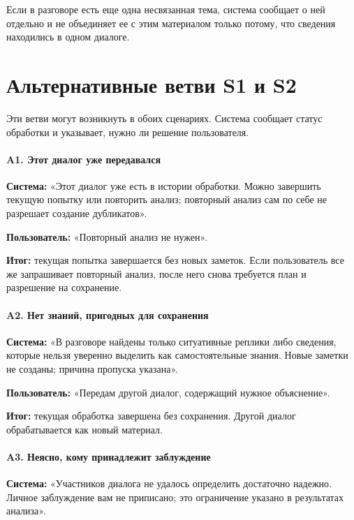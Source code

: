 Если в разговоре есть еще одна несвязанная тема, система сообщает о ней отдельно и не объединяет ее с этим материалом только потому, что сведения находились в одном диалоге.



\clearpage
\section{Альтернативные ветви S1 и S2}

Эти ветви могут возникнуть в обоих сценариях. Система сообщает статус обработки и указывает, нужно ли решение пользователя.


\paragraph{A1. Этот диалог уже передавался}

\textbf{Система:} «Этот диалог уже есть в истории обработки. Можно завершить текущую попытку или повторить анализ; повторный анализ сам по себе не разрешает создание дубликатов».


\textbf{Пользователь:} «Повторный анализ не нужен».


\textbf{Итог:} текущая попытка завершается без новых заметок. Если пользователь все же запрашивает повторный анализ, после него снова требуется план и разрешение на сохранение.


\paragraph{A2. Нет знаний, пригодных для сохранения}

\textbf{Система:} «В разговоре найдены только ситуативные реплики либо сведения, которые нельзя уверенно выделить как самостоятельные знания. Новые заметки не созданы; причина пропуска указана».


\textbf{Пользователь:} «Передам другой диалог, содержащий нужное объяснение».


\textbf{Итог:} текущая обработка завершена без сохранения. Другой диалог обрабатывается как новый материал.


\paragraph{A3. Неясно, кому принадлежит заблуждение}

\textbf{Система:} «Участников диалога не удалось определить достаточно надежно. Личное заблуждение вам не приписано; это ограничение указано в результатах анализа».


